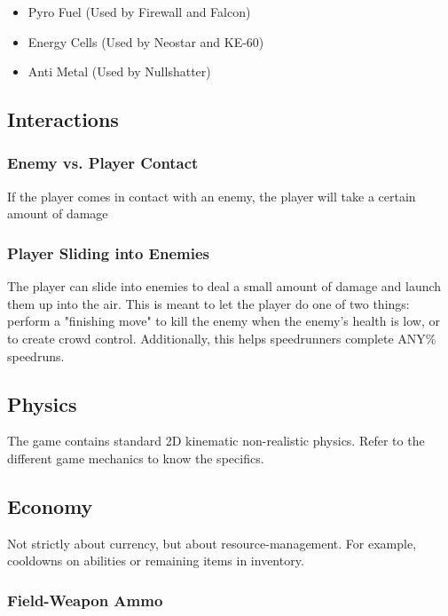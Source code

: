 \documentclass[12pt]{article}
\begin{document}
\begin{itemize}
	\item Pyro Fuel (Used by Firewall and Falcon)
	\item Energy Cells (Used by Neostar and KE-60)
	\item Anti Metal (Used by Nullshatter)
\end{itemize}

\subsection{Interactions}

\subsubsection{Enemy vs. Player Contact}

If the player comes in contact with an enemy, the player will take a certain amount of damage

\subsubsection{Player Sliding into Enemies}

The player can slide into enemies to deal a small amount of damage and launch them up into the air. This is meant to let the player do one of two things: perform a "finishing move" to kill the enemy when the enemy's health is low, or to create crowd control. Additionally, this helps speedrunners complete ANY\% speedruns. 

\subsection{Physics}

The game contains standard 2D kinematic non-realistic physics. Refer to the different game mechanics to know the specifics.

\subsection{Economy}

Not strictly about currency, but about resource-management. For example, cooldowns on abilities or remaining items in inventory. 

\subsubsection{Field-Weapon Ammo}
\end{document}
